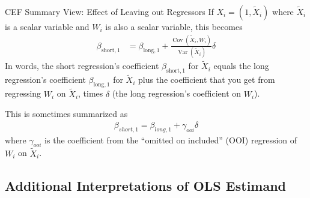 \documentclass[aspectratio=169, handout]{beamer}
\newcommand{\Cov}{\operatorname{Cov}}
\newcommand{\Var}{\operatorname{Var}}
\begin{document}
{\footnotesize
\begin{frame}{CEF Summary View: Effect of Leaving out Regressors}
If $X_i=(1,\tilde{X}_i)$ where $\tilde{X}_i$ is a scalar variable and
$W_i$ is also a scalar variable, this becomes
\begin{align*}
  \beta_{\text{short},1}
  &=
  \beta_{\text{long},1}
  +
  \frac{\Cov(\tilde{X}_i,W_i)}{\Var(\tilde{X}_i)}
  \delta
\end{align*}
In words, the \alert{short} regression's coefficient
$\beta_{\text{short},1}$ for
$\tilde{X}_i$ equals the \alert{long} regression's coefficient
$\beta_{\text{long},1}$
for $\tilde{X}_i$ plus the coefficient that you get from
regressing $W_i$ on $\tilde{X}_i$, times $\delta$ (the long
regression's coefficient on $W_i$).

This is sometimes summarized as
\begin{align*}
  {\beta}_{short,1}
  =
  {\beta}_{long,1}
  +
  {\gamma}_{ooi}
  {\delta}
\end{align*}
where $\gamma_{ooi}$ is the coefficient from the ``omitted on included''
(OOI) regression of $W_i$ on $\tilde{X}_i$.
\end{frame}
}


\subsection{Additional Interpretations of OLS Estimand}
\end{document}
